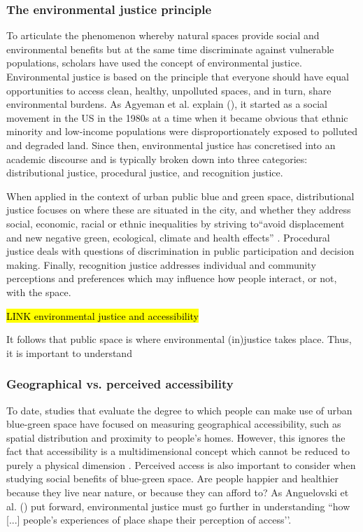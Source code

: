 \documentclass{article}
\begin{document}
\subsubsection{The environmental justice principle}

To articulate the phenomenon whereby natural spaces provide social and environmental benefits but at the same time discriminate against vulnerable populations, scholars have used the concept of environmental justice.
Environmental justice is based on the principle that everyone should have equal opportunities to access clean, healthy, unpolluted spaces, and in turn, share environmental burdens. As Agyeman et al. explain (\citeyear{agyeman2016trends}), it started as a social movement in the US in the 1980s at a time when it became obvious that ethnic minority and low-income populations were disproportionately exposed to polluted and degraded land.
Since then, environmental justice has concretised into an academic discourse and is typically broken down into three categories: distributional justice, procedural justice, and recognition justice.

When applied in the context of urban public blue and green space, distributional justice focuses on where these are situated in the city, and whether they address social, economic, racial or ethnic inequalities by striving to``avoid displacement and new negative green, ecological, climate and health effects'' \parencite{anguelovski2020expanding}.
Procedural justice deals with questions of discrimination in public participation and decision making. 
Finally, recognition justice addresses individual and community perceptions and preferences which may influence how people interact, or not, with the space.

\hl{LINK environmental justice and accessibility}

It follows that public space is where environmental (in)justice takes place. Thus, it is important to understand 

\subsubsection{Geographical vs. perceived accessibility}

To date, studies that evaluate the degree to which people can make use of urban blue-green space have focused on measuring geographical accessibility, such as spatial distribution and proximity to people’s homes. %
However, this ignores the fact that accessibility is a multidimensional concept which cannot be reduced to purely a physical dimension \parencite{wang2015physical}. Perceived access is also important to consider when studying social benefits of blue-green space. Are people happier and healthier because they live near nature, or because they can afford to?
As Anguelovski et al. (\citeyear{anguelovski2020expanding}) put forward, environmental justice must go further in understanding ``how [...] people’s experiences of place shape their perception of access’’.
\end{document}
